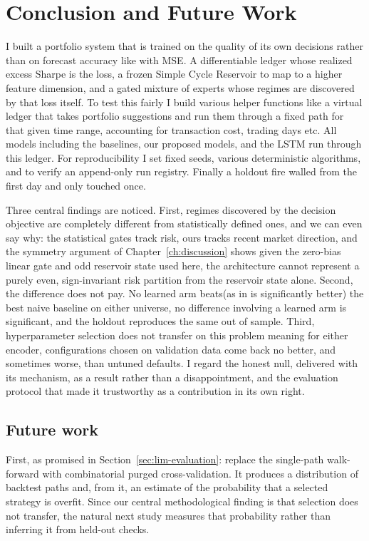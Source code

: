 
\chapter{Conclusion and Future Work}
\label{ch:conclusion}

I built a portfolio system that is trained on the quality of its own decisions rather than on forecast accuracy like with MSE. A differentiable ledger whose realized excess Sharpe is the loss, a frozen Simple Cycle Reservoir to map to a higher feature dimension, and a gated mixture of experts whose regimes are discovered by that loss itself. To test this fairly I build various helper functions like a virtual ledger that takes portfolio suggestions and run them through a fixed path for that given time range, accounting for transaction cost, trading days etc. All models including the baselines, our proposed models, and the LSTM run through this ledger. For reproducibility I set fixed seeds, various deterministic algorithms, and to verify an append-only run registry. Finally a holdout fire walled from the first day and only touched once.

Three central findings are noticed. First, regimes discovered by the decision objective are completely different from statistically defined ones, and we can even say why: the statistical gates track risk, ours tracks recent market direction, and the symmetry argument of Chapter~\ref{ch:discussion} shows given the zero-bias linear gate and odd reservoir state used here, the architecture cannot represent a purely even, sign-invariant risk partition from the reservoir state alone. Second, the difference does not pay. No learned arm beats(as in is significantly better) the best naive baseline on either universe, no difference involving a learned arm is significant, and the holdout reproduces the same out of sample. Third, hyperparameter selection does not transfer on this problem meaning for either encoder, configurations chosen on validation data come back no better, and sometimes worse, than untuned defaults. I regard the honest null, delivered with its mechanism, as a result rather than a disappointment, and the evaluation protocol that made it trustworthy as a contribution in its own right.

\section{Future work}
\label{sec:concl-future}
First, as promised in Section~\ref{sec:lim-evaluation}: replace the single-path walk-forward with combinatorial purged cross-validation. It produces a distribution of backtest paths and, from it, an estimate of the probability that a selected strategy is overfit. Since our central methodological finding is that selection does not transfer, the natural next study measures that probability rather than inferring it from held-out checks.

